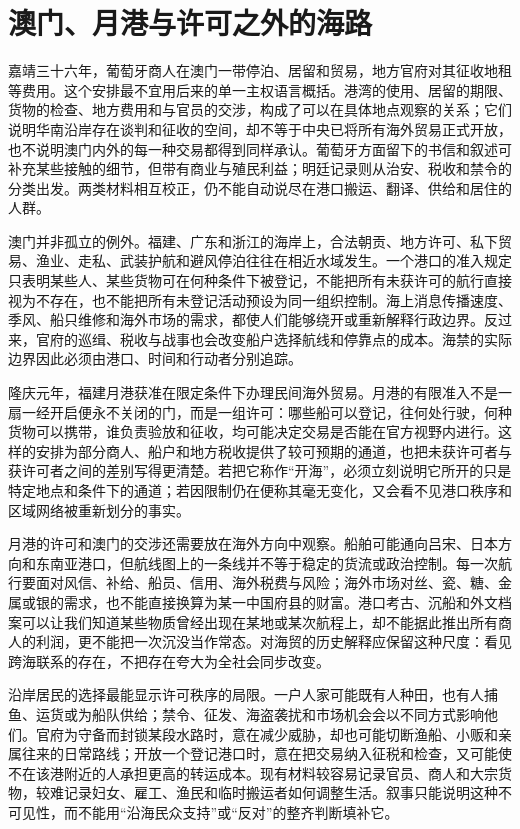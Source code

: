 \section{澳门、月港与许可之外的海路}

嘉靖三十六年，葡萄牙商人在澳门一带停泊、居留和贸易，地方官府对其征收地租等费用。这个安排最不宜用后来的单一主权语言概括。港湾的使用、居留的期限、货物的检查、地方费用和与官员的交涉，构成了可以在具体地点观察的关系；它们说明华南沿岸存在谈判和征收的空间，却不等于中央已将所有海外贸易正式开放，也不说明澳门内外的每一种交易都得到同样承认。葡萄牙方面留下的书信和叙述可补充某些接触的细节，但带有商业与殖民利益；明廷记录则从治安、税收和禁令的分类出发。两类材料相互校正，仍不能自动说尽在港口搬运、翻译、供给和居住的人群。

澳门并非孤立的例外。福建、广东和浙江的海岸上，合法朝贡、地方许可、私下贸易、渔业、走私、武装护航和避风停泊往往在相近水域发生。一个港口的准入规定只表明某些人、某些货物可在何种条件下被登记，不能把所有未获许可的航行直接视为不存在，也不能把所有未登记活动预设为同一组织控制。海上消息传播速度、季风、船只维修和海外市场的需求，都使人们能够绕开或重新解释行政边界。反过来，官府的巡缉、税收与战事也会改变船户选择航线和停靠点的成本。海禁的实际边界因此必须由港口、时间和行动者分别追踪。

隆庆元年，福建月港获准在限定条件下办理民间海外贸易。月港的有限准入不是一扇一经开启便永不关闭的门，而是一组许可：哪些船可以登记，往何处行驶，何种货物可以携带，谁负责验放和征收，均可能决定交易是否能在官方视野内进行。这样的安排为部分商人、船户和地方税收提供了较可预期的通道，也把未获许可者与获许可者之间的差别写得更清楚。若把它称作“开海”，必须立刻说明它所开的只是特定地点和条件下的通道；若因限制仍在便称其毫无变化，又会看不见港口秩序和区域网络被重新划分的事实。

月港的许可和澳门的交涉还需要放在海外方向中观察。船舶可能通向吕宋、日本方向和东南亚港口，但航线图上的一条线并不等于稳定的货流或政治控制。每一次航行要面对风信、补给、船员、信用、海外税费与风险；海外市场对丝、瓷、糖、金属或银的需求，也不能直接换算为某一中国府县的财富。港口考古、沉船和外文档案可以让我们知道某些物质曾经出现在某地或某次航程上，却不能据此推出所有商人的利润，更不能把一次沉没当作常态。对海贸的历史解释应保留这种尺度：看见跨海联系的存在，不把存在夸大为全社会同步改变。

沿岸居民的选择最能显示许可秩序的局限。一户人家可能既有人种田，也有人捕鱼、运货或为船队供给；禁令、征发、海盗袭扰和市场机会会以不同方式影响他们。官府为守备而封锁某段水路时，意在减少威胁，却也可能切断渔船、小贩和亲属往来的日常路线；开放一个登记港口时，意在把交易纳入征税和检查，又可能使不在该港附近的人承担更高的转运成本。现有材料较容易记录官员、商人和大宗货物，较难记录妇女、雇工、渔民和临时搬运者如何调整生活。叙事只能说明这种不可见性，而不能用“沿海民众支持”或“反对”的整齐判断填补它。

